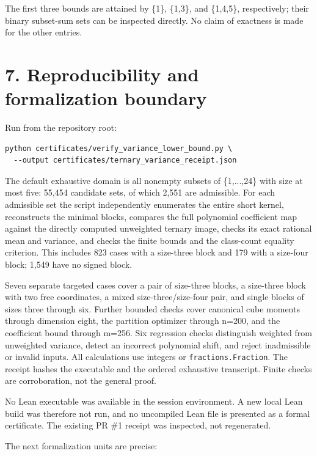 The first three bounds are attained by \{1\}, \{1,3\}, and \{1,4,5\}, respectively; their binary subset-sum sets can be inspected directly. No claim of exactness is made for the other entries.

\section{7. Reproducibility and formalization boundary}\label{n01-reproducibility-and-formalization-boundary}

Run from the repository root:

\begin{Verbatim}[breaklines=true,breakanywhere=true,fontsize=\footnotesize]
python certificates/verify_variance_lower_bound.py \
  --output certificates/ternary_variance_receipt.json
\end{Verbatim}

The default exhaustive domain is all nonempty subsets of \{1,...,24\} with size at most five: 55,454 candidate sets, of which 2,551 are admissible. For each admissible set the script independently enumerates the entire short kernel, reconstructs the minimal blocks, compares the full polynomial coefficient map against the directly computed unweighted ternary image, checks its exact rational mean and variance, and checks the finite bounds and the class-count equality criterion. This includes 823 cases with a size-three block and 179 with a size-four block; 1,549 have no signed block.

Seven separate targeted cases cover a pair of size-three blocks, a size-three block with two free coordinates, a mixed size-three/size-four pair, and single blocks of sizes three through six. Further bounded checks cover canonical cube moments through dimension eight, the partition optimizer through n=200, and the coefficient bound through m=256. Six regression checks distinguish weighted from unweighted variance, detect an incorrect polynomial shift, and reject inadmissible or invalid inputs. All calculations use integers or \texttt{fractions.Fraction}. The receipt hashes the executable and the ordered exhaustive transcript. Finite checks are corroboration, not the general proof.

No Lean executable was available in the session environment. A new local Lean build was therefore not run, and no uncompiled Lean file is presented as a formal certificate. The existing PR \#1 receipt was inspected, not regenerated.

The next formalization units are precise:

